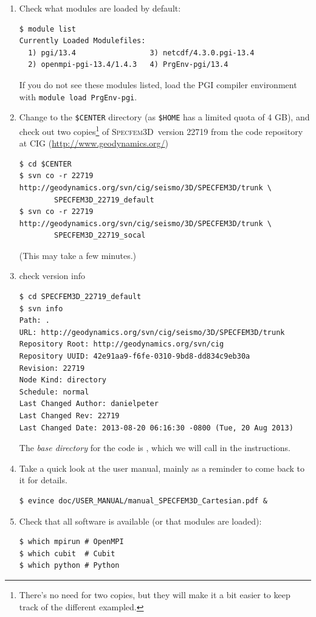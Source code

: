 \documentclass[10pt,fleqn,letterpaper]{article}
\newcommand{\specfem}{\textsc{Specfem3D}}
\begin{document}
\begin{enumerate}
\item Check what modules are loaded by default:
%
\begin{lstlisting}
$ module list
Currently Loaded Modulefiles:
  1) pgi/13.4                 3) netcdf/4.3.0.pgi-13.4
  2) openmpi-pgi-13.4/1.4.3   4) PrgEnv-pgi/13.4
\end{lstlisting}

If you do not see these modules listed, load the PGI compiler environment with \lstinline{module load PrgEnv-pgi}.

\item Change to the \verb+$CENTER+ directory (as \verb+$HOME+ has a limited quota of 4 GB), and check out two copies\footnote{There's no need for two copies, but they will make it a bit easier to keep track of the different exampled.} of \specfem\ version 22719 from the code repository at CIG (\url{http://www.geodynamics.org/})
%
\begin{lstlisting}
$ cd $CENTER
$ svn co -r 22719 http://geodynamics.org/svn/cig/seismo/3D/SPECFEM3D/trunk \
        SPECFEM3D_22719_default
$ svn co -r 22719 http://geodynamics.org/svn/cig/seismo/3D/SPECFEM3D/trunk \
        SPECFEM3D_22719_socal
\end{lstlisting}
%
(This may take a few minutes.)

\item check version info
%
\begin{lstlisting}
$ cd SPECFEM3D_22719_default
$ svn info
Path: .
URL: http://geodynamics.org/svn/cig/seismo/3D/SPECFEM3D/trunk
Repository Root: http://geodynamics.org/svn/cig
Repository UUID: 42e91aa9-f6fe-0310-9bd8-dd834c9eb30a
Revision: 22719
Node Kind: directory
Schedule: normal
Last Changed Author: danielpeter
Last Changed Rev: 22719
Last Changed Date: 2013-08-20 06:16:30 -0800 (Tue, 20 Aug 2013)
\end{lstlisting}

The {\em base directory} for the code is , which we will call  in the instructions.

\item Take a quick look at the user manual, mainly as a reminder to come back to it for details. 
%
\begin{lstlisting}
$ evince doc/USER_MANUAL/manual_SPECFEM3D_Cartesian.pdf &
\end{lstlisting}

\item Check that all software is available (or that modules are loaded):
\begin{lstlisting}
$ which mpirun # OpenMPI
$ which cubit  # Cubit
$ which python # Python
\end{lstlisting}


\end{enumerate}
\end{document}
